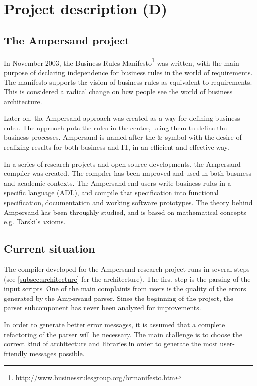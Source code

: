 \section{Project description (D)}
\label{sec:project-description}

\subsection{The Ampersand project}
In November 2003, the Business Rules Manifesto\footnote{\url{http://www.businessrulesgroup.org/brmanifesto.htm}} was written, with the main purpose of declaring independence for business rules in the world of requirements.
The manifesto supports the vision of business rules as equivalent to requirements.
This is considered a radical change on how people see the world of business architecture.

Later on, the Ampersand approach was created as a way for defining business rules.
The approach puts the rules in the center, using them to define the business processes.
Ampersand is named after the \& symbol with the desire of realizing results for both business and IT, in an efficient and effective way.

In a series of research projects and open source developments, the Ampersand compiler was created.
The compiler has been improved and used in both business and academic contexts.
The Ampersand end-users write business rules in a specific language (ADL), and compile that specification into functional specification, documentation and working software prototypes.
%
The theory behind Ampersand has been throughly studied, and is based on mathematical concepts e.g. Tarski's axioms.

\subsection{Current situation}
The compiler developed for the Ampersand research project runs in several steps (see \autoref{subsec:architecture} for the architecture).
The first step is the parsing of the input scripts.
One of the main complaints from users is the quality of the errors generated by the Ampersand parser.
Since the beginning of the project, the parser subcomponent has never been analyzed for improvements.

In order to generate better error messages, it is assumed that a complete refactoring of the parser will be necessary.
The main challenge is to choose the correct kind of architecture and libraries in order to generate the most user-friendly messages possible.

